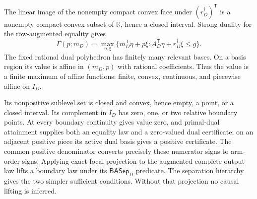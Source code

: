 The linear image of the nonempty compact convex face under \((r_D^\dagger)^{\mathsf T}\) is a nonempty compact convex subset of \(\mathbb R\), hence a closed interval.  Strong duality for the row-augmented equality gives
\[
\Gamma(p;m_D)=
\max_{\eta,\xi}
\{m_D^{\mathsf T}\eta+p\xi:
A_D^{\mathsf T}\eta+r_D^\dagger\xi\leq g\}.
\tag{1}
\]
The fixed rational dual polyhedron has finitely many relevant bases.  On a basis region its value is affine in \((m_D,p)\) with rational coefficients.  Thus the value is a finite maximum of affine functions: finite, convex, continuous, and piecewise affine on \(I_D\).

Its nonpositive sublevel set is closed and convex, hence empty, a point, or a closed interval.  Its complement in \(I_D\) has zero, one, or two relative boundary points.  At every boundary continuity gives value zero, and primal-dual attainment supplies both an equality law and a zero-valued dual certificate; on an adjacent positive piece its active dual basis gives a positive certificate.  The common positive denominator converts precisely these numerator signs to arm-order signs.  Applying exact focal projection to the augmented complete output law lifts a boundary law under its \(\mathsf{BASep}_D\) predicate.  The separation hierarchy gives the two simpler sufficient conditions.  Without that projection no causal lifting is inferred.